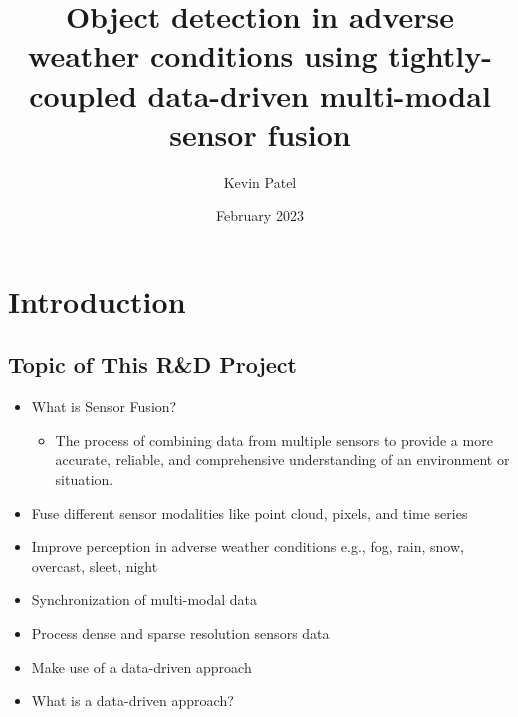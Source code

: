 \documentclass[rnd]{mas_proposal}
\title{Object detection in adverse weather conditions using tightly-coupled data-driven multi-modal sensor fusion}
\author{Kevin Patel}
\date{February 2023}
\begin{document}
\maketitle

\pagestyle{plain}

\section{Introduction}

\subsection{Topic of This R\&D Project}
\begin{itemize}
    \item What is Sensor Fusion?
    \begin{itemize}
        \item The process of combining data from multiple sensors to provide a more accurate, reliable, and comprehensive understanding of an environment or situation.
    \end{itemize}

    
    \item Fuse different sensor modalities like point cloud, pixels, and time series 
    \item Improve perception in adverse weather conditions e.g., fog, rain, snow, overcast, sleet, night
    \item Synchronization of multi-modal data
    \item Process dense and sparse resolution sensors data
    \item Make use of a data-driven approach
    \item What is a data-driven approach?


\end{itemize}
\end{document}
